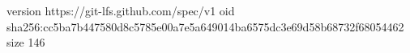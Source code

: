 version https://git-lfs.github.com/spec/v1
oid sha256:cc5ba7b447580d8c5785e00a7e5a649014ba6575dc3e69d58b68732f68054462
size 146
